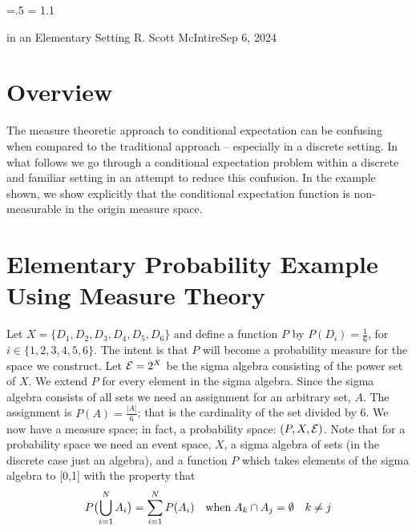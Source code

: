 




\parindent=0pt
\parskip=.5\baselineskip
\baselineskip = 1.1\baselineskip

\footline{\hss\tenrm\folio\hss}

        {in an Elementary Setting}
{R. Scott McIntire}{Sep 6, 2024}

\section{Overview}
The measure theoretic approach to conditional expectation can be confusing
when compared to the traditional approach -- especially in a discrete 
setting. In what follows we go through a conditional 
expectation problem within a discrete and familiar setting in an attempt 
to reduce this confusion. In the example shown, we show explicitly that the 
conditional expectation function is non-measurable in the origin 
measure space.


\section{Elementary Probability Example Using Measure Theory}
Let $X = \{D_1, D_2, D_3, D_4, D_5, D_6\}$ and define a function $P$ by 
$P(D_i) = \frac{1}{6}$, for $i\in \{1,2,3,4,5,6\}$. The intent is that $P$ will 
become a probability measure for the space we construct.
Let ${\cal E} = 2^X$ be the sigma  algebra 
consisting of the power set of $X$. We extend $P$ for every element in the sigma algebra.
Since the sigma algebra consists of all sets 
we need an assignment for an arbitrary set, $A$. 
The assignment is $P(A) = \frac{|A|}{6}$; that is the cardinality of the set divided by 6.
We now have a measure space; in fact, a probability space: $(P,X,{\cal E})$.
Note that for a probability space we need an event space, $X$, a sigma algebra of sets 
(in the discrete case just an algebra), and a function $P$ which takes 
elements of the sigma algebra to [0,1] with the property that 
$$
P\bigl(\mathop{\bigcup}_{i=1}^N A_i\bigr) = \sum_{i=1}^N P(A_i) 
\quad {\rm when}\;  A_k \cap A_j = \emptyset \quad k\neq j
$$

